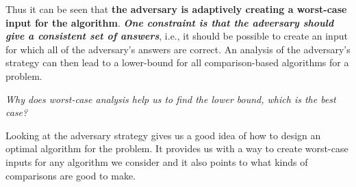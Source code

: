 \documentclass[en,hazy,blue,screen,14pt]{elegantnote}
\begin{document}
Thus it can be seen that \textbf{the adversary is adaptively creating
a worst-case input for the algorithm}. \textbf{\emph{One constraint
is that the adversary should give a consistent set of answers}}, i.e.,
it should be possible to create an input for which all of the adversary\textquoteright s
answers are correct. An analysis of the adversary\textquoteright s
strategy can then lead to a lower-bound for all comparison-based algorithms
for a problem. 

\emph{Why does worst-case analysis help us to find the lower bound,
which is the best case?}

Looking at the adversary strategy gives us a good idea of how to design
an optimal algorithm for the problem. It provides us with a way to
create worst-case inputs for any algorithm we consider and it also
points to what kinds of comparisons are good to make. 
\end{document}
